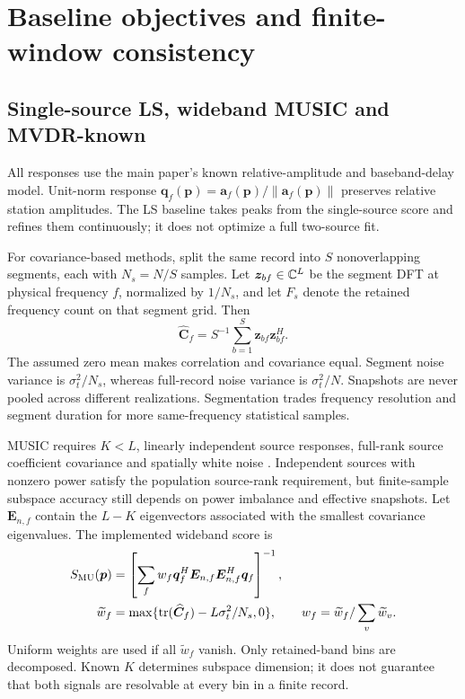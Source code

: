 \documentclass[a4paper,12pt,review]{cas-sc}
\begin{document}
\section{Baseline objectives and finite-window consistency}
\subsection{Single-source LS, wideband MUSIC and MVDR-known}
All responses use the main paper's known relative-amplitude and baseband-delay model. Unit-norm response $\bm q_f(\bm p)=\bm a_f(\bm p)/\|\bm a_f(\bm p)\|$ preserves relative station amplitudes. The LS baseline takes peaks from the single-source score and refines them continuously; it does not optimize a full two-source fit.

For covariance-based methods, split the same record into $S$ nonoverlapping segments, each with $N_s=N/S$ samples. Let $\bm z_{bf}\in\mathbb C^L$ be the segment DFT at physical frequency $f$, normalized by $1/N_s$, and let $F_s$ denote the retained frequency count on that segment grid. Then
\begin{equation}
\widehat{\bm C}_f=S^{-1}\sum_{b=1}^S\bm z_{bf}\bm z_{bf}^H.
\end{equation}
The assumed zero mean makes correlation and covariance equal. Segment noise variance is $\sigma_t^2/N_s$, whereas full-record noise variance is $\sigma_t^2/N$. Snapshots are never pooled across different realizations. Segmentation trades frequency resolution and segment duration for more same-frequency statistical samples.

MUSIC requires $K<L$, linearly independent source responses, full-rank source coefficient covariance and spatially white noise \cite{WeissAmar2005}. Independent sources with nonzero power satisfy the population source-rank requirement, but finite-sample subspace accuracy still depends on power imbalance and effective snapshots. Let $\bm E_{n,f}$ contain the $L-K$ eigenvectors associated with the smallest covariance eigenvalues. The implemented wideband score is
\begin{align}
S_{\rm MU}(\bm p)&=\left[\sum_f w_f\bm q_f^H\bm E_{n,f}\bm E_{n,f}^H\bm q_f\right]^{-1},\\
\widetilde w_f&=\max\{\operatorname{tr}(\widehat{\bm C}_f)-L\sigma_t^2/N_s,0\},
\qquad w_f=\widetilde w_f/\sum_v\widetilde w_v.
\end{align}
Uniform weights are used if all $\widetilde w_f$ vanish. Only retained-band bins are decomposed. Known $K$ determines subspace dimension; it does not guarantee that both signals are resolvable at every bin in a finite record.
\end{document}
